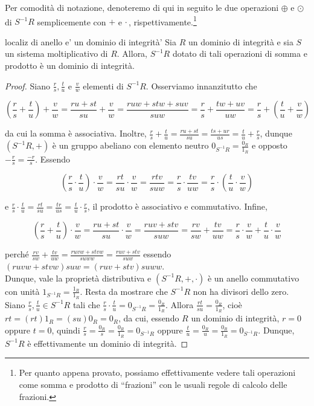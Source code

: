 \begin{obs} Per comodità di notazione, denoteremo di qui in seguito le due operazioni $\oplus$ e $\odot$ di $S^{-1}R$ semplicemente con $+$ e $\cdot$\,, 
  rispettivamente.\footnote{Per quanto appena provato, possiamo effettivamente vedere tali operazioni come somma e prodotto di 
  ``frazioni'' con le usuali regole di calcolo delle frazioni.}
\end{obs}

\begin{prop}{localiz di anello e' un dominio di integrità'}
  Sia $R$ un dominio di integrità e sia $S$ un sistema moltiplicativo di $R$. 
  Allora, $S^{-1}R$ dotato di tali operazioni di somma e prodotto è un dominio di integrità.
\end{prop}
\vspace{-4mm}
\begin{proof}
  Siano $\frac{r}{s}, \frac{t}{u}$ e $\frac{v}{w}$ elementi di $S^{-1}R$. Osserviamo innanzitutto che 
  
  \[ \left(\frac{r}{s}+\frac{t}{u}\right)+\frac{v}{w}=\frac{ru+st}{su}+\frac{v}{w}=\frac{ruw+stw+suv}{suw}=
  \frac{r}{s}+\frac{tw+uv}{uw}=\frac{r}{s}+\left(\frac{t}{u}+\frac{v}{w}\right) \] 
  
  \noindent da cui la somma è associativa. Inoltre, $\frac{r}{s}+\frac{t}{u}=\frac{ru+st}{su}=\frac{ts+ur}{us}=\frac{t}{u}+\frac{r}{s}$, 
  dunque $(S^{-1}R,+)$ è un gruppo abeliano con elemento neutro $0_{S^{-1}R}=\frac{0_R}{1_R}$ e opposto $-\frac{r}{s}=\frac{-r}{s}$. Essendo 
  
  \[ \left(\frac{r}{s}\cdot\frac{t}{u}\right)\cdot\frac{v}{w}=\frac{rt}{su}\cdot\frac{v}{w}=\frac{rtv}{suw}=\frac{r}{s}\cdot\frac{tv}{uw}=
  \frac{r}{s}\cdot\left(\frac{t}{u}\cdot\frac{v}{w}\right) \] 
  
  \noindent e $\frac{r}{s}\cdot\frac{t}{u}=\frac{rt}{su}=\frac{tr}{us}=\frac{t}{u}\cdot\frac{r}{s}$, il prodotto è associativo e commutativo. Infine, 
  
  \[ \left(\frac{r}{s}+\frac{t}{u}\right)\cdot \frac{v}{w}=\frac{ru+st}{su}\cdot \frac{v}{w}=\frac{ruv+stv}{suw}=
  \frac{rv}{sw}+\frac{tv}{uw}=\frac{r}{s}\cdot \frac{v}{w}+\frac{t}{u}\cdot \frac{v}{w} \] 
  
  \noindent perché $\frac{rv}{sw}+\frac{tv}{uw}=\frac{ruvw+stvw}{suww}=\frac{ruv+stv}{suw}$ essendo $(ruvw+stvw)suw=(ruv+stv)suww$. \vspace{0.5mm}\\
  Dunque, vale la proprietà distributiva e $(S^{-1}R,+,\cdot)$ è un anello commutativo con unità $1_{S^{-1}R}=\frac{1_R}{1_R}$. 
  Resta da mostrare che $S^{-1}R$ non ha divisori dello zero. Siano $\frac{r}{s}, \frac{t}{u}\in S^{-1}R$ tali che 
  $\frac{r}{s}\cdot \frac{t}{u}=0_{S^{-1}R}=\frac{0_R}{1_R}$. Allora $\frac{rt}{su}=\frac{0_R}{1_R}$, cioè $rt=(rt)1_R=(su)0_R=0_R$, da cui, 
  essendo $R$ un dominio di integrità, $r=0$ oppure $t=0$, quindi $\frac{r}{s}=\frac{0_R}{s}=\frac{0_R}{1_R}=0_{S^{-1}R}$ oppure 
  $\frac{t}{u}=\frac{0_R}{u}=\frac{0_R}{1_R}=0_{S^{-1}R}$. Dunque, $S^{-1}R$ è effettivamente un dominio di integrità.
\end{proof}

